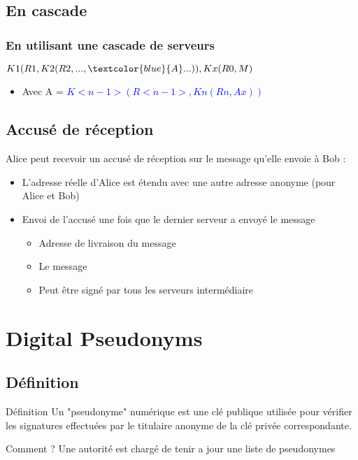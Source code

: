 \documentclass{beamer}
\begin{document}
\subsection{En cascade}
\begin{frame}
\frametitle{En utilisant une cascade de serveurs}
\begin{center}
$K1( R1, K2( R2, ..., \textcolor{blue}{A} ...)), Kx( R0, M )$
\end{center}
\begin{itemize}
[triangle]
\item Avec A = \textcolor{blue}{$K<n-1>( R<n-1>, Kn( Rn, Ax ))$}
\end{itemize}
\end{frame}

\subsection{Accusé de réception}
\begin{frame}
Alice peut recevoir un accusé de réception sur le message qu'elle envoie à Bob :
\begin{itemize}
[triangle]
\item L'adresse réelle d'Alice est étendu avec une autre adresse anonyme (pour Alice et Bob)
\item Envoi de l'accusé une fois que le dernier serveur a envoyé le message
	\begin{itemize}
	\item Adresse de livraison du message
	\item Le message
	\item Peut être signé par tous les serveurs intermédiaire
	\end{itemize}
\end{itemize}
\end{frame}

\section{Digital Pseudonyms}
\subsection{Définition}
\begin{frame}
\begin{block}{Définition}
Un "pseudonyme" numérique est une clé publique utilisée pour vérifier les signatures effectuées par le titulaire anonyme de la clé privée correspondante.
\end{block}
\begin{block}{Comment ?}
Une autorité est chargé de tenir a jour une liste de pseudonymes
\end{block}
\end{frame}
\end{document}
